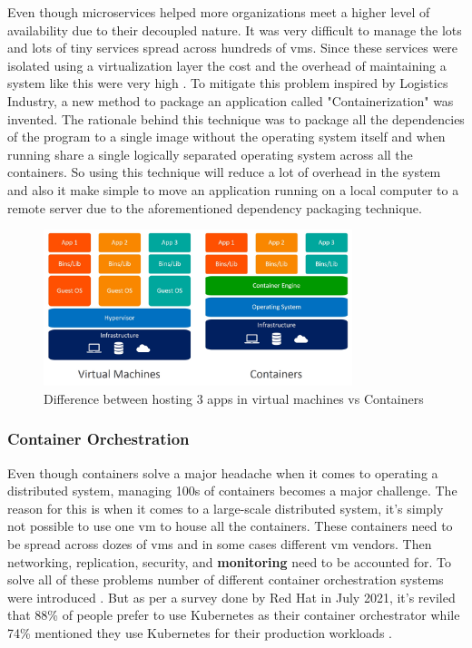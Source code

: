 Even though microservices helped more organizations meet a higher level of availability due to their decoupled nature. It was very difficult to manage the lots and lots of tiny services spread across hundreds of \acp{vm}. Since these services were isolated using a virtualization layer the cost and the overhead of maintaining a system like this were very high \citep{dua2014virtualization}. To mitigate this problem inspired by Logistics Industry, a new method to package an application called "Containerization" was invented. The rationale behind this technique was to package all the dependencies of the program to a single image without the operating system itself and when running share a single logically separated operating system across all the containers. So using this technique will reduce a lot of overhead in the system and also it make simple to move an application running on a local computer to a remote server due to the aforementioned dependency packaging technique.

\begin{figure}[H]
    \includegraphics[width=9cm]{assets/literature-review/containers-vs-virtual-machines.jpg}
    \caption{Difference between hosting 3 apps in virtual machines vs Containers \citep{Dockervs91:online}}
\end{figure}

\subsubsection{Container Orchestration}

Even though containers solve a major headache when it comes to operating a distributed system, managing 100s of containers becomes a major challenge. The reason for this is when it comes to a large-scale distributed system, it's simply not possible to use one \ac{vm} to house all the containers. These containers need to be spread across dozes of \acp{vm} and in some cases different \ac{vm} vendors. Then networking, replication, security, and \textbf{monitoring} need to be accounted for. To solve all of these problems number of different container orchestration systems were introduced \citep{ElasticityCloudComputing}. But as per a survey done by Red Hat in July 2021, it's reviled that 88\% of people prefer to use Kubernetes as their container orchestrator while 74\% mentioned they use Kubernetes for their production workloads \citep{Kubernet59:online}.

